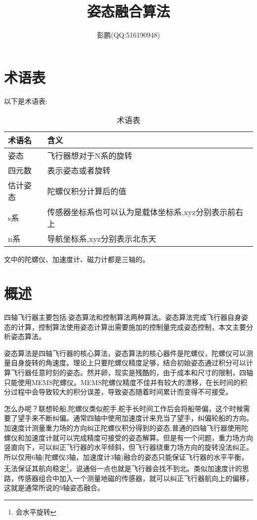 \documentclass[12pt,a4paper]{article}
\title{姿态融合算法}
\author{彭鹏(QQ:516190948)}
\begin{document}
\maketitle
\newpage
\tableofcontents
\newpage

\section{术语表} 
以下是术语表:
\begin{table}[!hbp]
\begin{center}
    \begin{tabular}{|l|l|}
        \hline
        术语名 & 含义 \\
        \hline
        姿态 & 飞行器想对于N系的旋转 \\
        \hline
        四元数 & 表示姿态或者旋转 \\
        \hline
        估计姿态 & 陀螺仪积分计算后的值 \\
        \hline
        s系 & 传感器坐标系也可以认为是载体坐标系,xyz分别表示前右上 \\
        \hline
        n系 & 导航坐标系,xyz分别表示北东天 \\
        \hline
    \end{tabular}
    \caption{术语表\label{术语表}}
\end{center}
\end{table}

文中的陀螺仪、加速度计、磁力计都是三轴的。
\newpage

\section{概述}
四轴飞行器主要包括:姿态算法和控制算法两种算法。姿态算法完成飞行器自身姿态的计算，控制算法使用姿态计算出需要施加的控制量完成姿态控制，本文主要分析姿态算法。

姿态算法是四轴飞行器的核心算法，姿态算法的核心器件是陀螺仪，陀螺仪可以测量自身旋转的角速度。理论上只要陀螺仪精度足够，结合初始姿态通过积分可以计算飞行器任意时刻的姿态。然并卵，现实是残酷的，由于成本和尺寸的限制，四轴只能使用MEMS陀螺仪。MEMS陀螺仪精度不佳并有较大的漂移，在长时间的积分过程中会导致较大的积分误差，导致姿态随着时间累计而变得不可接受\cite{捷联惯导航}。

怎么办呢？\cite{9轴融合论文}联想轮船,陀螺仪类似舵手,舵手长时间工作后会将船带偏，这个时候需要了望手来不断纠偏。通常四轴中使用加速度计来充当了望手，纠偏轮船的方向。加速度计测量重力场的方向纠正陀螺仪积分得到的姿态,普通的四轴飞行器使用陀螺仪和加速度计就可以完成精度可接受的姿态解算。但是有一个问题，重力场方向竖直向下，可以纠正飞行器的水平倾斜，但飞行器绕重力场方向的旋转没法纠正。所以仅用6轴(陀螺仪3轴，加速度计3轴)融合的姿态只能保证飞行器的水平平衡，无法保证其航向稳定\footnote{会水平旋转}，说通俗一点也就是飞行器会找不到北。类似加速度计的思路，传感器组合中加入一个测量地磁的传感器\cite{经典博客}，就可以纠正飞行器航向上的偏移，这就是通常所说的9轴姿态融合。
\end{document}
